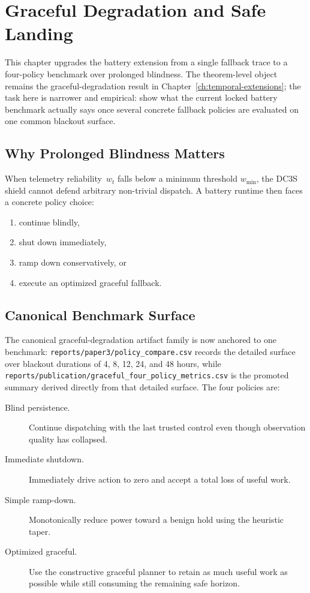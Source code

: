 \chapter{Graceful Degradation and Safe Landing}
\label{ch:graceful-degradation}

This chapter upgrades the battery extension from a single fallback trace to a
four-policy benchmark over prolonged blindness.  The theorem-level object
remains the graceful-degradation result in
Chapter~\ref{ch:temporal-extensions}; the task here is narrower and empirical:
show what the current locked battery benchmark actually says once several
concrete fallback policies are evaluated on one common blackout surface.

\section{Why Prolonged Blindness Matters}

When telemetry reliability~$w_t$ falls below a minimum threshold
$w_{\min}$, the DC3S shield cannot defend arbitrary non-trivial dispatch.
A battery runtime then faces a concrete policy choice:

\begin{enumerate}
  \item continue blindly,
  \item shut down immediately,
  \item ramp down conservatively, or
  \item execute an optimized graceful fallback.
\end{enumerate}

\section{Canonical Benchmark Surface}

The canonical graceful-degradation artifact family is now anchored to one benchmark:
\texttt{reports/paper3/policy\_compare.csv} records the detailed surface over
blackout durations of 4, 8, 12, 24, and 48 hours, while
\texttt{reports/publication/graceful\_four\_policy\_metrics.csv} is the
promoted summary derived directly from that detailed surface.  The four
policies are:

\begin{description}
  \item[Blind persistence.] Continue dispatching with the last trusted control
    even though observation quality has collapsed.
  \item[Immediate shutdown.] Immediately drive action to zero and accept a
    total loss of useful work.
  \item[Simple ramp-down.] Monotonically reduce power toward a benign hold
    using the heuristic taper.
  \item[Optimized graceful.] Use the constructive graceful planner to retain
    as much useful work as possible while still consuming the remaining safe
    horizon.
\end{description}

